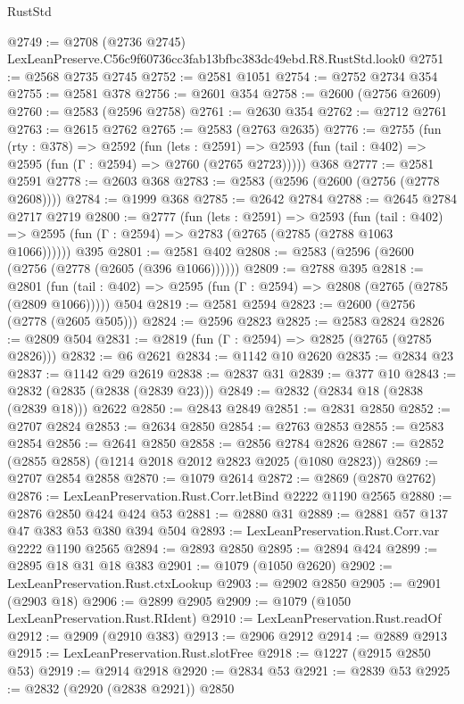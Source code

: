 \begin{lexlean}{RustStd}
\begin{coremodule}
@2749 := @2708 (@2736 @2745) LexLeanPreserve.C56c9f60736cc3fab13bfbc383dc49ebd.R8.RustStd.look0
@2751 := @2568 @2735 @2745
@2752 := @2581 @1051
@2754 := @2752 @2734 @354
@2755 := @2581 @378
@2756 := @2601 @354
@2758 := @2600 (@2756 @2609)
@2760 := @2583 (@2596 @2758)
@2761 := @2630 @354
@2762 := @2712 @2761
@2763 := @2615 @2762
@2765 := @2583 (@2763 @2635)
@2776 := @2755
    (fun (rty : @378) =>
    @2592
      (fun (lets : @2591) =>
      @2593 (fun (tail : @402) => @2595 (fun (Γ : @2594) => @2760 (@2765 @2723)))))
    @368
@2777 := @2581 @2591
@2778 := @2603 @368
@2783 := @2583 (@2596 (@2600 (@2756 (@2778 @2608))))
@2784 := @1999 @368
@2785 := @2642 @2784
@2788 := @2645 @2784 @2717 @2719
@2800 := @2777
    (fun (lets : @2591) =>
    @2593
      (fun (tail : @402) => @2595 (fun (Γ : @2594) => @2783 (@2765 (@2785 (@2788 @1063 @1066))))))
    @395
@2801 := @2581 @402
@2808 := @2583 (@2596 (@2600 (@2756 (@2778 (@2605 (@396 @1066))))))
@2809 := @2788 @395
@2818 := @2801
    (fun (tail : @402) => @2595 (fun (Γ : @2594) => @2808 (@2765 (@2785 (@2809 @1066)))))
    @504
@2819 := @2581 @2594
@2823 := @2600 (@2756 (@2778 (@2605 @505)))
@2824 := @2596 @2823
@2825 := @2583 @2824
@2826 := @2809 @504
@2831 := @2819 (fun (Γ : @2594) => @2825 (@2765 (@2785 @2826)))
@2832 := @6 @2621
@2834 := @1142 @10 @2620
@2835 := @2834 @23
@2837 := @1142 @29 @2619
@2838 := @2837 @31
@2839 := @377 @10
@2843 := @2832 (@2835 (@2838 (@2839 @23)))
@2849 := @2832 (@2834 @18 (@2838 (@2839 @18))) @2622
@2850 := @2843 @2849
@2851 := @2831 @2850
@2852 := @2707 @2824
@2853 := @2634 @2850
@2854 := @2763 @2853
@2855 := @2583 @2854
@2856 := @2641 @2850
@2858 := @2856 @2784 @2826
@2867 := @2852 (@2855 @2858) (@1214 @2018 @2012 @2823 @2025 (@1080 @2823))
@2869 := @2707 @2854 @2858
@2870 := @1079 @2614
@2872 := @2869 (@2870 @2762)
@2876 := LexLeanPreservation.Rust.Corr.letBind @2222 @1190 @2565
@2880 := @2876 @2850 @424 @424 @53
@2881 := @2880 @31
@2889 := @2881 @57 @137 @47 @383 @53 @380 @394 @504
@2893 := LexLeanPreservation.Rust.Corr.var @2222 @1190 @2565
@2894 := @2893 @2850
@2895 := @2894 @424
@2899 := @2895 @18 @31 @18 @383
@2901 := @1079 (@1050 @2620)
@2902 := LexLeanPreservation.Rust.ctxLookup
@2903 := @2902 @2850
@2905 := @2901 (@2903 @18)
@2906 := @2899 @2905
@2909 := @1079 (@1050 LexLeanPreservation.Rust.RIdent)
@2910 := LexLeanPreservation.Rust.readOf
@2912 := @2909 (@2910 @383)
@2913 := @2906 @2912
@2914 := @2889 @2913
@2915 := LexLeanPreservation.Rust.slotFree
@2918 := @1227 (@2915 @2850 @53)
@2919 := @2914 @2918
@2920 := @2834 @53
@2921 := @2839 @53
@2925 := @2832 (@2920 (@2838 @2921)) @2850

\end{coremodule}
\end{lexlean}
